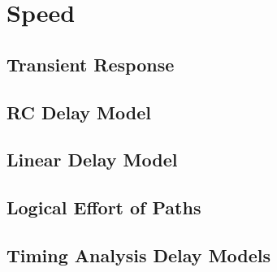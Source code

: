 \section{Speed}

\subsection{Transient Response}

\subsection{RC Delay Model}

\subsection{Linear Delay Model}

\subsection{Logical Effort of Paths}

\subsection{Timing Analysis Delay Models}
